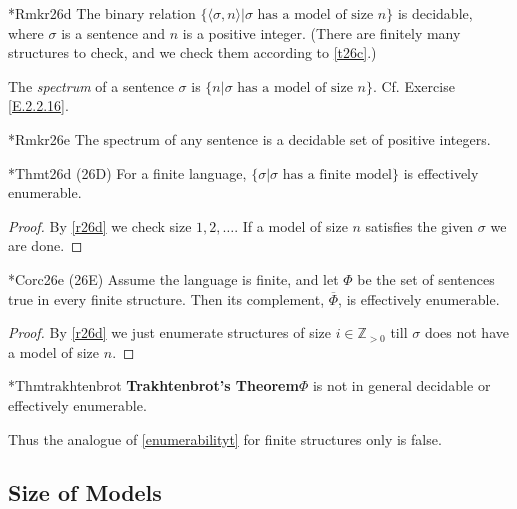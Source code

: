 \begin{reference}{*Rmk}{r26d}
  The binary relation $\{\langle \sigma,n\rangle|\sigma\text{ has a model of size }n\}$ is decidable, where $\sigma$ is a sentence and $n$ is a positive integer. (There are finitely many structures to check, and we check them according to \ref{t26c}.)
\end{reference}

The \textit{spectrum} of a sentence $\sigma$ is $\{n|\sigma\text{ has a model of size }n\}$. Cf. Exercise \ref{E.2.2.16}.

\begin{reference}{*Rmk}{r26e}
  The spectrum of any sentence is a decidable set of positive integers.
\end{reference}


\begin{reference}{*Thm}{t26d}
  (26D) For a finite language, $\{\sigma|\sigma\text{ has a finite model}\}$ is effectively enumerable.
\end{reference}

\begin{proof}
  By \ref{r26d} we check size $1,2,\dots$. If a model of size $n$ satisfies the given $\sigma$ we are done.
\end{proof}

\begin{reference}{*Cor}{c26e}
  (26E) Assume the language is finite, and let $\Phi$ be the set of sentences true in every finite structure. Then its complement, $\overline{\Phi}$, is effectively enumerable.
\end{reference}

\begin{proof}
  By \ref{r26d} we just enumerate structures of size $i\in\mathbb{Z}_{>0}$ till $\sigma$ does not have a model of size $n$.
\end{proof}

\begin{reference}{*Thm}{trakhtenbrot}
  \textbf{Trakhtenbrot's Theorem}\quad $\Phi$ is not in general decidable or effectively enumerable.
\end{reference}

Thus the analogue of \ref{enumerabilityt} for finite structures only is false.

\subsection*{Size of Models}

